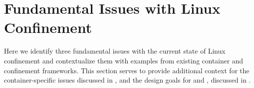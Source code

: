 


\section{Fundamental Issues with Linux Confinement}%
\label{s:cp-issues}

Here we identify three fundamental issues with the current state of Linux confinement and
contextualize them with examples from existing container and confinement frameworks. This
section serves to provide additional context for the container-specific issues discussed
in , and the design goals for \bpfbox{} and \bpfcontain{}, discussed
in .

